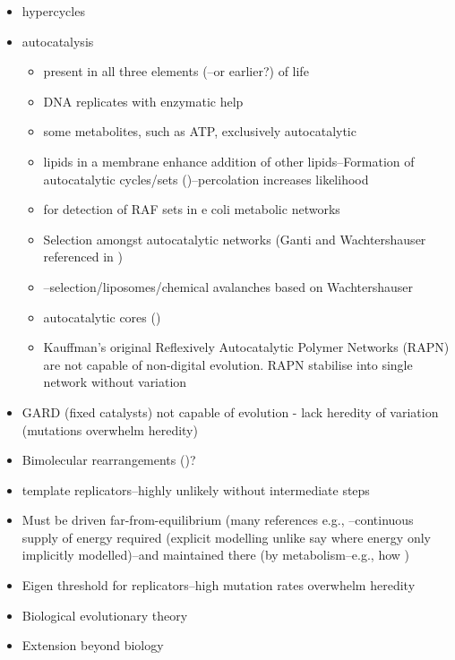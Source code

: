 	\begin{itemize}
		\item
		hypercycles \autocite{Eigen1971}
		\item
		autocatalysis
		\begin{itemize}
			\item
			present in all three elements (\autocite{Ganti:2003hl}--or
			earlier?) of life
			\item
			DNA replicates with enzymatic help
			\item
			some metabolites, such as ATP, exclusively autocatalytic
			\item
			lipids in a membrane enhance addition of other lipids--Formation of
			autocatalytic cycles/sets (\autocite{Hordijk2004})--percolation increases
			likelihood
			\item
			\autocite{Sousa2015} for detection of RAF sets in e coli metabolic
			networks
			\item
			Selection amongst autocatalytic networks (Ganti and Wachtershauser referenced in \autocite{Fernando:2005ly})
			\item
			\autocite{Fernando:2007pf}--selection/liposomes/chemical avalanches
			based on Wachtershauser
			\item
			autocatalytic cores (\autocite{Vasas2012})
			\item
			Kauffman's original Reflexively Autocatalytic Polymer Networks
			(RAPN) \autocite{Kauffman1986,Farmer1986} are not capable of
			non-digital evolution. RAPN stabilise into single network without
			variation
		\end{itemize}
		\item
		GARD (fixed catalysts) \autocite{Segre1998} not capable of evolution -
		lack heredity of variation (mutations overwhelm heredity) \autocite{Vasas2010}
		\item
		Bimolecular rearrangements (\autocite{Fernando:2008xy,Fernando:2007pf})?
		\item
		template replicators--highly unlikely without intermediate steps
		\item
		Must be driven far-from-equilibrium (many references e.g.,
		\autocite{Pascal2015}--continuous supply of energy required (explicit
		modelling unlike say \autocite{Fontana1994} where energy only
		implicitly modelled)--and maintained there (by metabolism--e.g., how
		)
		\item
		Eigen threshold for replicators--high mutation rates overwhelm
		heredity
		\item
		Biological evolutionary theory
		\item
		Extension beyond biology
		

\end{itemize}
